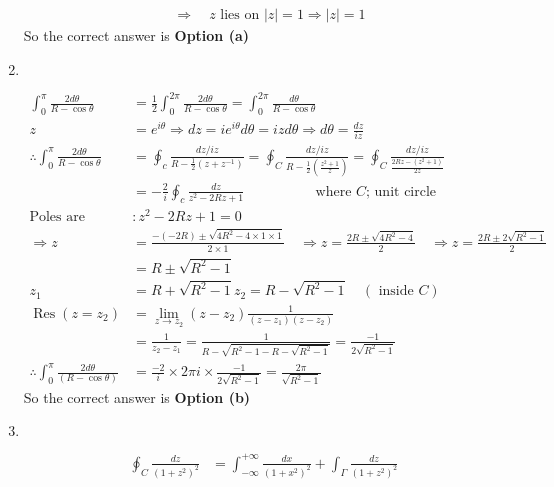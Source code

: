 \begin{enumerate}
\begin{answer}
\begin{align*}
	&\Rightarrow \quad z\text{ lies on }|z|=1 \Rightarrow|z|=1
	\end{align*}
		So the correct answer is \textbf{Option (a)}
\end{answer}
	\item $\left. \right. $
\begin{answer}
	\begin{align*}
	\int_{0}^{\pi} \frac{2 d \theta}{R-\cos \theta}&=\frac{1}{2} \int_{0}^{2 \pi} \frac{2 d \theta}{R-\cos \theta}=\int_{0}^{2 \pi} \frac{d \theta}{R-\cos \theta}\\
	z&=e^{i \theta} \Rightarrow d z=i e^{i \theta} d \theta=i z d \theta \Rightarrow d \theta=\frac{d z}{i z} \\
	\therefore \int_{0}^{\pi} \frac{2 d \theta}{R-\cos \theta}&=\oint_{c} \frac{d z / i z}{R-\frac{1}{2}\left(z+z^{-1}\right)}=\oint_{C} \frac{d z / i z}{R-\frac{1}{2}\left(\frac{z^{2}+1}{z}\right)}=\oint_{C} \frac{d z / i z}{\frac{2 R z-\left(z^{2}+1\right)}{2 z}}\\
	&=-\frac{2}{i} \oint_{c} \frac{d z}{z^{2}-2 R z+1}\hspace{2cm}
	\text{	where $C$; unit circle}\\
	\text{Poles are }&: z^{2}-2 R z+1=0\\
	\Rightarrow z&=\frac{-(-2 R) \pm \sqrt{4 R^{2}-4 \times 1 \times 1}}{2 \times 1} \quad \Rightarrow z=\frac{2 R \pm \sqrt{4 R^{2}-4}}{2} \quad \Rightarrow z=\frac{2 R \pm 2 \sqrt{R^{2}-1}}{2}\\
	&=R \pm \sqrt{R^{2}-1}\\
	z_{1}&=R+\sqrt{R^{2}-1} z_{2}=R-\sqrt{R^{2}-1} \quad(\text{ inside }C)\\
	\operatorname{Res}\left(z=z_{2}\right)&=\lim _{z \rightarrow z_{2}}\left(z-z_{2}\right) \frac{1}{\left(z-z_{1}\right)\left(z-z_{2}\right)}\\
	&=\frac{1}{z_{2}-z_{1}}=\frac{1}{R-\sqrt{R^{2}-1-R-\sqrt{R^{2}-1}}}=\frac{-1}{2 \sqrt{R^{2}-1}}\\
	\therefore \int_{0}^{\pi} \frac{2 d \theta}{(R-\cos \theta)}&=\frac{-2}{i} \times 2 \pi i \times \frac{-1}{2 \sqrt{R^{2}-1}}=\frac{2 \pi}{\sqrt{R^{2}-1}}
	\end{align*}
	So the correct answer is \textbf{Option (b)}
\end{answer}
\item $\left. \right. $
\begin{answer}
	\begin{align*}
	\oint_{C} \frac{d z}{\left(1+z^{2}\right)^{2}}&=\int_{-\infty}^{+\infty} \frac{d x}{\left(1+x^{2}\right)^{2}}+\int_{\Gamma} \frac{d z}{\left(1+z^{2}\right)^{2}}\\

\end{align*}
\end{answer}
\end{enumerate}
